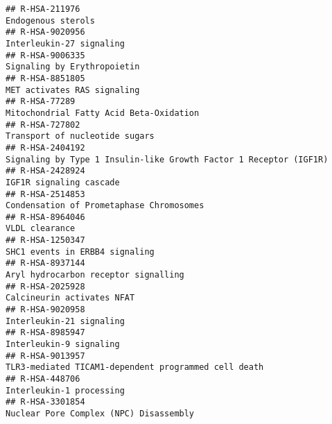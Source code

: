 \documentclass[
]{article}
\begin{document}
\begin{verbatim}
## R-HSA-211976                                                                                                                    Endogenous sterols
## R-HSA-9020956                                                                                                             Interleukin-27 signaling
## R-HSA-9006335                                                                                                          Signaling by Erythropoietin
## R-HSA-8851805                                                                                                          MET activates RAS signaling
## R-HSA-77289                                                                                                Mitochondrial Fatty Acid Beta-Oxidation
## R-HSA-727802                                                                                                        Transport of nucleotide sugars
## R-HSA-2404192                                                                    Signaling by Type 1 Insulin-like Growth Factor 1 Receptor (IGF1R)
## R-HSA-2428924                                                                                                              IGF1R signaling cascade
## R-HSA-2514853                                                                                             Condensation of Prometaphase Chromosomes
## R-HSA-8964046                                                                                                                       VLDL clearance
## R-HSA-1250347                                                                                                       SHC1 events in ERBB4 signaling
## R-HSA-8937144                                                                                                 Aryl hydrocarbon receptor signalling
## R-HSA-2025928                                                                                                           Calcineurin activates NFAT
## R-HSA-9020958                                                                                                             Interleukin-21 signaling
## R-HSA-8985947                                                                                                              Interleukin-9 signaling
## R-HSA-9013957                                                                                 TLR3-mediated TICAM1-dependent programmed cell death
## R-HSA-448706                                                                                                              Interleukin-1 processing
## R-HSA-3301854                                                                                               Nuclear Pore Complex (NPC) Disassembly

\end{verbatim}
\end{document}
